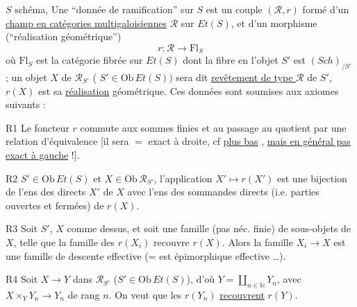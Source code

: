 $S$ schéma, 
Une ``donnée de ramification'' sur $S$ est un couple $(\mathscr R,r)$ formé d'un \uline{champ en catégories multigaloisiennes} $\mathscr R$ sur $Et(S)$,
et d'un morphisme   (``réalisation géométrique'')
\[
r:\mathscr R\longrightarrow \mathrm{Fl}_S
\]
où $\mathrm{Fl}_S$ est la  catégorie fibrée sur $Et(S)$ dont la fibre en l'objet $S'$ est $(Sch)_{/S'}$ ;
 un objet $X$ de $\mathscr R_{S'}$ (  $S'\in\mathrm{Ob}\,Et(S))$ sera dit \uline{revêtement de type $\mathscr R$} de $S'$,  $r(X)$ est sa \uline{réalisation} géométrique.
 Ces données sont soumises aux axiomes suivants :

R1 Le foncteur $r$ commute aux sommes finies et au passage au quotient
par une relation d'équivalence
[il sera $=$ exact à droite, cf \uline{plus bas} \unsure{\ldots}, \uline{mais en général pas exact à gauche} !].

R2  $S'\in\mathrm{Ob}\,Et(S)$ et $X\in\mathrm{Ob}\,\mathscr R_{S'}$, l'application $X'\mapsto r(X')$ est une bijection de l'ens des  directs  $X'$ de $X$ avec l'ens des sommandes directs (i.e. parties ouvertes et fermées) de $r(X)$.

R3 Soit $S'$, $X$ comme dessus, et soit  une famille (pas néc. finie) de  sous-objets de $X$, telle que la famille des $r(X_i)$ recouvre $r(X)$. Alors la  famille $X_i\longrightarrow X$ est une famille de descente effective (= est épimorphique effective \ldots).

R4 Soit $X\to Y$ dans $\mathscr R_{S'}$ ($S'\in\mathrm{Ob}\,Et(S)$), d'où $Y=\coprod_{n\in\mathbb N}Y_n$, avec $X\times_Y Y_n\to Y_n$ de rang $n$. On veut que les $r(Y_n)$ \uline{recouvrent} $r(Y)$.

